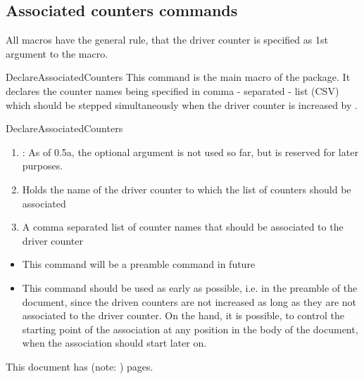 \documentclass[12pt,paper=a4]{ltxdoc}
\let\DeclareAssociatedCountersOrig\DeclareAssociatedCounters
\def\packageversion{0.5a}%
\begin{document}
\subsection{Associated counters commands}

All macros have the general rule, that the driver counter is specified as 1st argument to the macro.


\begin{docCommand}{DeclareAssociatedCounters}{}
This command is the main macro of the package. It declares the counter names being specified in comma - separated - list (CSV) which should be stepped simultaneously when the driver counter is increased by .

\begin{docCommandArgs}{DeclareAssociatedCounters}

\begin{enumerate}[label={\textcolor{blue}{\#\arabic*}}]
  \item {}: As of \packageversion, the optional argument  is not used so far, but is reserved for later purposes.

  \item {} 

    Holds the name of the driver counter to which the list of counters should be associated
\item {}

  A comma separated list of counter names that should be associated to the driver counter
\end{enumerate}
\end{docCommandArgs}


\begin{itemize}
\item This command will be a preamble command in future
\item This command should be used as early as possible, i.e. in the preamble of the document, since the driven counters are not increased as long as they are not associated to the driver counter. On the hand, it is possible, to control the starting point of the association at any position in the body of the document, when the association should start later on. 
\end{itemize}


\renewcommand{\DeclareAssociatedCounters}[3][]{\relax}%
\begin{dispExample}
\DeclareAssociatedCounters{page}{totalpages,anothertotalpages}%
This document has \number{} (note: \number{}) pages.
\end{dispExample}
\let\DeclareAssociatedCounters\DeclareAssociatedCountersOrig%


\end{docCommand}
\end{document}
